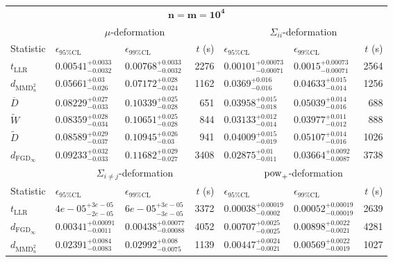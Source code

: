 \begin{tabular}{l|llr|llr}
	\toprule
	\multicolumn{7}{c}{$\mathbf{n=m=10^{4}}$} \\
	\multicolumn{1}{c}{} & \multicolumn{3}{c}{$\mu$-deformation} & \multicolumn{3}{c}{$\Sigma_{ii}$-deformation} \\
	Statistic & $\epsilon_{95\%\mathrm{CL}}$ & $\epsilon_{99\%\mathrm{CL}}$ & $t$ (s) & $\epsilon_{95\%\mathrm{CL}}$ & $\epsilon_{99\%\mathrm{CL}}$ & $t$ (s) \\
	\midrule
	$t_{\mathrm{LLR}}$ & $0.00541_{-0.0032}^{+0.0033}$ & $0.00768_{-0.0032}^{+0.0033}$ & 2276 & $0.00101_{-0.00071}^{+0.00073}$ & $0.0015_{-0.00071}^{+0.00073}$ & 2564 \\
	$d_{\mathrm{MMD}^{2}_{u}}$ & $0.05661_{-0.026}^{+0.03}$ & $0.07172_{-0.024}^{+0.028}$ & 1162 & $0.0369_{-0.016}^{+0.016}$ & $0.04633_{-0.014}^{+0.015}$ & 1256 \\
	$\overline{D}$ & $0.08229_{-0.033}^{+0.027}$ & $0.10339_{-0.028}^{+0.025}$ & 651 & $0.03958_{-0.018}^{+0.015}$ & $0.05039_{-0.016}^{+0.014}$ & 688 \\
	$\widetilde{W}$ & $0.08359_{-0.034}^{+0.028}$ & $0.10651_{-0.028}^{+0.025}$ & 844 & $0.03133_{-0.014}^{+0.012}$ & $0.03977_{-0.012}^{+0.011}$ & 888 \\
	$\widetilde{D}$ & $0.08589_{-0.037}^{+0.029}$ & $0.10945_{-0.03}^{+0.026}$ & 941 & $0.04009_{-0.019}^{+0.015}$ & $0.05107_{-0.016}^{+0.014}$ & 1026 \\
	$d_{\mathrm{FGD}_{\infty}}$ & $0.09233_{-0.033}^{+0.032}$ & $0.11682_{-0.027}^{+0.029}$ & 3408 & $0.02875_{-0.011}^{+0.01}$ & $0.03664_{-0.0087}^{+0.0092}$ & 3738 \\
	\toprule
	\multicolumn{1}{c}{} & \multicolumn{3}{c}{$\Sigma_{i\neq j}$-deformation} & \multicolumn{3}{c}{$\rm{pow}_{+}$-deformation} \\
	Statistic & $\epsilon_{95\%\mathrm{CL}}$ & $\epsilon_{99\%\mathrm{CL}}$ & $t$ (s) & $\epsilon_{95\%\mathrm{CL}}$ & $\epsilon_{99\%\mathrm{CL}}$ & $t$ (s) \\
	\midrule
	$t_{\mathrm{LLR}}$ & $4e-05_{-2e-05}^{+3e-05}$ & $6e-05_{-3e-05}^{+3e-05}$ & 3372 & $0.00038_{-0.0002}^{+0.00019}$ & $0.00052_{-0.00019}^{+0.00019}$ & 2639 \\
	$d_{\mathrm{FGD}_{\infty}}$ & $0.00341_{-0.0011}^{+0.00091}$ & $0.00438_{-0.00088}^{+0.00077}$ & 4052 & $0.00707_{-0.0025}^{+0.0025}$ & $0.00898_{-0.0021}^{+0.0022}$ & 4281 \\
	$d_{\mathrm{MMD}^{2}_{u}}$ & $0.02391_{-0.0083}^{+0.0084}$ & $0.02992_{-0.0075}^{+0.008}$ & 1139 & $0.00447_{-0.0021}^{+0.0024}$ & $0.00569_{-0.0019}^{+0.0022}$ & 1027 \\

\end{tabular}
